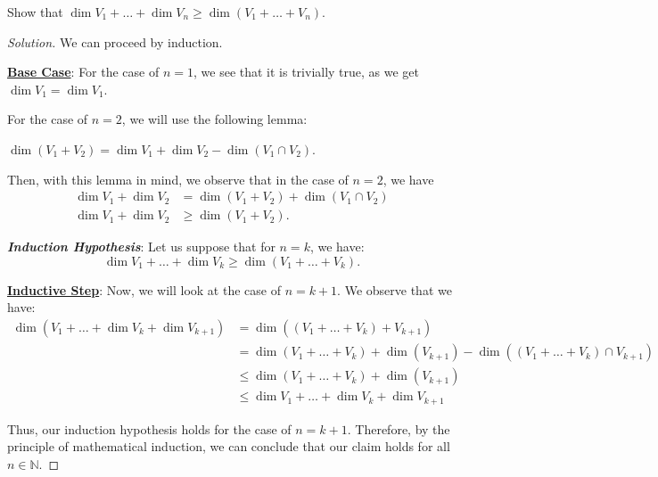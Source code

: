 \documentclass[openany]{book}
\newenvironment{solution}{\begin{proof}[Solution]}{\end{proof}}
\newcommand{\NN}{\mathbb{N}}
\begin{document}
\begin{hw}
	Show that $\dim V_{1} + \ldots + \dim V_{n} \geq \dim(V_{1} + \ldots + V_{n})$.
\end{hw}
\begin{solution}
	We can proceed by induction.
	
	\textbf{\underline{Base Case}}: For the case of $n=1$, we see that it is trivially true, as we get $\dim V_{1} = \dim V_{1}$.
	
	For the case of $n=2$, we will use the following lemma:
	\begin{lem}
		$\dim (V_{1} + V_{2}) = \dim V_{1} + \dim V_{2} - \dim(V_{1} \cap V_{2})$.
	\end{lem}

	Then, with this lemma in mind, we observe that in the case of $n=2$, we have
	\begin{align*}
		\dim V_{1} + \dim V_{2} &= \dim (V_{1} + V_{2}) + \dim (V_{1}\cap V_{2}) \\
		\dim V_{1} + \dim V_{2} &\geq \dim (V_{1} + V_{2}).
	\end{align*}

	\textbf{\textit{Induction Hypothesis}}: Let us suppose that for $n=k$, we have:
	\begin{equation*}
		\dim V_{1} + \ldots + \dim V_{k} \geq \dim (V_{1} + \ldots + V_{k}).
	\end{equation*}

	\textbf{\underline{Inductive Step}}: Now, we will look at the case of $n=k+1$. We observe that we have:
	\begin{align*}
		\dim (V_{1} + \ldots + \dim V_{k} + \dim V_{k+1}) &= \dim ( (V_{1} + \ldots + V_{k}) + V_{k+1}) \\
		&= \dim (V_{1} + \ldots + V_{k}) + \dim (V_{k+1}) - \dim ( (V_{1} + \ldots + V_{k}) \cap V_{k+1}) \\
		&\leq \dim (V_{1} + \ldots + V_{k}) + \dim(V_{k+1}) \\
		&\leq \dim V_{1} + \ldots + \dim V_{k} + \dim V_{k+1} 
	\end{align*}

	Thus, our induction hypothesis holds for the case of $n = k+1$. Therefore, by the principle of mathematical induction, we can conclude that our claim holds for all $n \in \NN$.
\end{solution}
\end{document}

